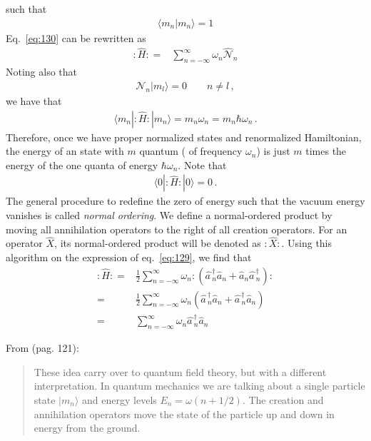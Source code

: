 \begin{frame}
such that
\begin{align}
    \langle m_n|m_n\rangle=1
\end{align}
Eq.~\eqref{eq:130} can be rewritten as
\begin{align}
  \colon\!\widehat{H}\colon=&\sum_{n=-\infty}^{\infty} \omega_n \widehat{\mathcal{N}}_n
\end{align}
Noting also that
\begin{align}
  \mathcal{N}_n|m_l\rangle=0\qquad n\ne l\,, 
\end{align}
we have that
\begin{align}
  \langle m_n|\colon\!\widehat{H}\colon|m_n\rangle=m_n \omega_n=m_n \hbar\omega_n\,.
\end{align}
Therefore, once we have proper normalized states and renormalized Hamiltonian, the energy of an state with $m$ quantum ( of frequency $\omega_n$) is just $m$ times the energy of the one quanta of energy $\hbar\omega_n$. Note that
\begin{align}
  \langle 0|\colon\!\widehat{H}\colon|0\rangle=0\,.
\end{align}
The general procedure to redefine the zero of energy such that the vacuum energy vanishes is called \emph{normal ordering}. We define a normal-ordered product  by moving all annihilation operators to the right of all creation operators. For an operator $\widehat{X}$, its normal-ordered product will be denoted as $\colon\widehat{X}\colon$. Using this algorithm on the expression of eq.~\eqref{eq:129}, we find that
\begin{align}
\label{eq:133}
  \colon\widehat{H}\colon=&\frac{1}{2}\sum_{n=-\infty}^{\infty} \omega_n \colon(\widehat{a\,}_{n}^\dagger\widehat{a}_{n} +\widehat{a}_{n} \widehat{a\,}_{n}^\dagger)\colon\nonumber\\
=&\frac{1}{2}\sum_{n=-\infty}^{\infty} \omega_n (\widehat{a\,}_{n}^\dagger\widehat{a}_{n} +\widehat{a\,}_{n}^\dagger\widehat{a}_{n} )\nonumber\\
=&\sum_{n=-\infty}^{\infty} \omega_n \widehat{a\,}_{n}^\dagger\widehat{a}_{n}
\end{align}



From \cite{McMahon:2009zz} (pag. 121):
\begin{quote}
  These idea carry over to quantum field theory, but with a different interpretation. In quantum mechanics we are talking about a single particle state $|m_n\rangle$ and energy levels $E_n=\omega(n+1/2)$. The creation and annihilation operators move the state of the particle up and down in energy from the ground.


\end{quote}
\end{frame}
